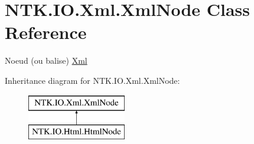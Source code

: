 \hypertarget{class_n_t_k_1_1_i_o_1_1_xml_1_1_xml_node}{}\section{N\+T\+K.\+I\+O.\+Xml.\+Xml\+Node Class Reference}
\label{class_n_t_k_1_1_i_o_1_1_xml_1_1_xml_node}


Noeud (ou balise) \mbox{\hyperlink{namespace_n_t_k_1_1_i_o_1_1_xml}{Xml}}  


Inheritance diagram for N\+T\+K.\+I\+O.\+Xml.\+Xml\+Node\+:\begin{figure}[H]
\begin{center}
\leavevmode
\includegraphics[height=2.000000cm]{d8/d8b/class_n_t_k_1_1_i_o_1_1_xml_1_1_xml_node}
\end{center}
\end{figure}
